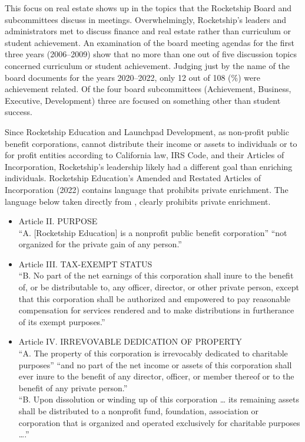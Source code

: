 This focus on real estate shows up in the topics that the Rocketship Board and subcommittees discuss in meetings. Overwhelmingly, Rocketship's leaders and administrators met to discuss finance and real estate rather than curriculum or student achievement. An examination of the board meeting agendas for the first three years (2006–2009) show that no more than one out of five discussion topics concerned curriculum or student achievement. Judging just by the name of the board documents for the years 2020–2022, only 12 out of 108 (\%) were achievement related. Of the four board subcommittees (Achievement, Business, Executive, Development) three are focused on something other than student success.

Since Rocketship Education and Launchpad Development, as non-profit public benefit corporations, cannot distribute their income or assets to individuals or to for profit entities according to California law, IRS Code, and their Articles of Incorporation, Rocketship's leadership  likely had a different goal than enriching individuals. Rocketship Education's Amended and Restated Articles of Incorporation (2022) contains language that prohibits private enrichment. The language below taken directly from \textcite{RSED2022}, clearly prohibits private enrichment.
\begin{itemize}
  \item Article II. PURPOSE\\\noindent ``A. [Rocketship Education] is a nonprofit public benefit corporation'' ``not organized for the private gain of any person.''
  \item Article III. TAX-EXEMPT STATUS\\\noindent ``B. No part of the net earnings of this corporation shall inure to the benefit of, or be distributable to, any officer, director, or other private person, except that this corporation shall be authorized and empowered to pay reasonable compensation for services rendered and to make distributions in furtherance of its exempt purposes.''
  \item Article IV. IRREVOVABLE DEDICATION OF PROPERTY\\\noindent ``A. The property of this corporation is irrevocably dedicated to charitable purposes'' ``and no part of the net income or assets of this corporation shall ever inure to the benefit of any director, officer, or member thereof or to the benefit of any private person.''\\\noindent
  ``B. Upon dissolution or winding up of this corporation … its remaining assets shall be distributed to a nonprofit fund, foundation, association or corporation that is organized and operated exclusively for charitable purposes ….''
\end{itemize}

